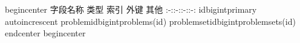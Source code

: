 {}\markdownRendererBackslash{}begin\markdownRendererLeftBrace{}center\markdownRendererRightBrace{}\markdownRendererInterblockSeparator
{}\markdownRendererPipe{} 字段名称 \markdownRendererPipe{} 类型 \markdownRendererPipe{} 索引 \markdownRendererPipe{} 外键 \markdownRendererPipe{} 其他 \markdownRendererPipe{} \markdownRendererPipe{}:-:\markdownRendererPipe{}:-:\markdownRendererPipe{}:-:\markdownRendererPipe{}:-:\markdownRendererPipe{} \markdownRendererPipe{}id\markdownRendererPipe{}bigint\markdownRendererPipe{}primary\markdownRendererPipe{}\markdownRendererPipe{} auto\markdownRendererBackslash{}\markdownRendererUnderscore{}increscent\markdownRendererPipe{} \markdownRendererPipe{}problem\markdownRendererBackslash{}\markdownRendererUnderscore{}id\markdownRendererPipe{}bigint\markdownRendererPipe{}\markdownRendererPipe{}problems(id)\markdownRendererPipe{}\markdownRendererPipe{} \markdownRendererPipe{}problem\markdownRendererBackslash{}\markdownRendererUnderscore{}set\markdownRendererBackslash{}\markdownRendererUnderscore{}id\markdownRendererPipe{}bigint\markdownRendererPipe{}\markdownRendererPipe{}problem\markdownRendererBackslash{}\markdownRendererUnderscore{}sets(id)\markdownRendererPipe{}\markdownRendererPipe{}\markdownRendererInterblockSeparator
{}\markdownRendererBackslash{}end\markdownRendererLeftBrace{}center\markdownRendererRightBrace{}\markdownRendererInterblockSeparator
{}\markdownRendererInterblockSeparator
{}\markdownRendererBackslash{}begin\markdownRendererLeftBrace{}center\markdownRendererRightBrace{}\markdownRendererInterblockSeparator
